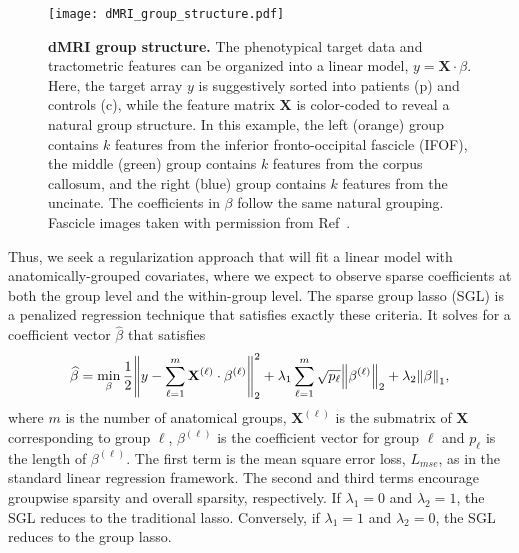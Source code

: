 \begin{figure}[!h]
    \centering
    \texttt{[image: dMRI\_group\_structure.pdf]}
    \caption{{\bf dMRI group structure.}
        The phenotypical target data and tractometric features can be organized into a linear model, $y = \mathbf{X} \cdot \beta$. Here, the target array $y$ is suggestively sorted into patients (p) and controls (c), while the feature matrix $\mathbf{X}$ is color-coded to reveal a natural group structure. In this example, the left (orange) group contains $k$ features from the inferior fronto-occipital fascicle (IFOF), the middle (green) group contains $k$ features from the corpus callosum, and the right (blue) group contains $k$ features from the uncinate. The coefficients in $\beta$ follow the same natural grouping. Fascicle images taken with permission from Ref~\cite{yeatman2012tract}.
    }
    \label{fig:group-structure}
\end{figure}

Thus, we seek a regularization approach that will fit a linear model with anatomically-grouped covariates, where we expect to observe sparse coefficients at both the group level and the within-group level. The sparse group lasso (SGL) is a penalized regression technique that satisfies exactly these criteria\cite{simon2013sparse}. It solves for a coefficient vector $\widehat{\beta}$ that satisfies
\begin{equation}
    \widehat{\beta} = \min_\beta \frac{1}{2}
    \norm*{y - \displaystyle \sum_{\ell = 1}^{m} \mathbf{X}^{(\ell)} \cdot \beta^{(\ell)}}_2^2
    + \lambda_1 \displaystyle \sum_{\ell = 1}^{m} \sqrt{p_\ell} \norm*{\beta^{(\ell)}}_2
    + \lambda_2 \norm*{\beta}_1,
    \label{eq:sgl}
\end{equation}
where $m$ is the number of anatomical groups, $\mathbf{X}^{(\ell)}$ is the submatrix of $\mathbf{X}$ corresponding to group $\ell$, $\beta^{(\ell)}$ is the coefficient vector for group $\ell$ and $p_\ell$ is the length of $\beta^{(\ell)}$. The first term is the mean square error loss, $L_{mse}$, as in the standard linear regression framework. The second and third terms encourage groupwise sparsity and overall sparsity, respectively. If $\lambda_1 = 0$ and $\lambda_2 = 1$, the SGL reduces to the traditional lasso\cite{tibshirani1996regression}. Conversely, if $\lambda_1 = 1$ and $\lambda_2 = 0$, the SGL reduces to the group lasso\cite{yuan2006model}.

